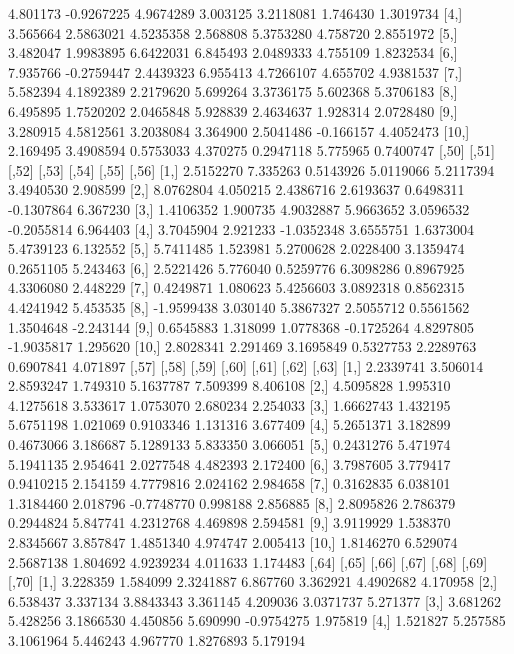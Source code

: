 \documentclass[12pt]{article}
\begin{document}
\begin{Schunk}
\begin{Soutput}
 [3,] 4.801173 -0.9267225 4.9674289 3.003125 3.2118081  1.746430 1.3019734
 [4,] 3.565664  2.5863021 4.5235358 2.568808 5.3753280  4.758720 2.8551972
 [5,] 3.482047  1.9983895 6.6422031 6.845493 2.0489333  4.755109 1.8232534
 [6,] 7.935766 -0.2759447 2.4439323 6.955413 4.7266107  4.655702 4.9381537
 [7,] 5.582394  4.1892389 2.2179620 5.699264 3.3736175  5.602368 5.3706183
 [8,] 6.495895  1.7520202 2.0465848 5.928839 2.4634637  1.928314 2.0728480
 [9,] 3.280915  4.5812561 3.2038084 3.364900 2.5041486 -0.166157 4.4052473
[10,] 2.169495  3.4908594 0.5753033 4.370275 0.2947118  5.775965 0.7400747
           [,50]    [,51]      [,52]      [,53]     [,54]      [,55]     [,56]
 [1,]  2.5152270 7.335263  0.5143926  5.0119066 5.2117394  3.4940530  2.908599
 [2,]  8.0762804 4.050215  2.4386716  2.6193637 0.6498311 -0.1307864  6.367230
 [3,]  1.4106352 1.900735  4.9032887  5.9663652 3.0596532 -0.2055814  6.964403
 [4,]  3.7045904 2.921233 -1.0352348  3.6555751 1.6373004  5.4739123  6.132552
 [5,]  5.7411485 1.523981  5.2700628  2.0228400 3.1359474  0.2651105  5.243463
 [6,]  2.5221426 5.776040  0.5259776  6.3098286 0.8967925  4.3306080  2.448229
 [7,]  0.4249871 1.080623  5.4256603  3.0892318 0.8562315  4.4241942  5.453535
 [8,] -1.9599438 3.030140  5.3867327  2.5055712 0.5561562  1.3504648 -2.243144
 [9,]  0.6545883 1.318099  1.0778368 -0.1725264 4.8297805 -1.9035817  1.295620
[10,]  2.8028341 2.291469  3.1695849  0.5327753 2.2289763  0.6907841  4.071897
          [,57]    [,58]     [,59]    [,60]      [,61]    [,62]    [,63]
 [1,] 2.2339741 3.506014 2.8593247 1.749310  5.1637787 7.509399 8.406108
 [2,] 4.5095828 1.995310 4.1275618 3.533617  1.0753070 2.680234 2.254033
 [3,] 1.6662743 1.432195 5.6751198 1.021069  0.9103346 1.131316 3.677409
 [4,] 5.2651371 3.182899 0.4673066 3.186687  5.1289133 5.833350 3.066051
 [5,] 0.2431276 5.471974 5.1941135 2.954641  2.0277548 4.482393 2.172400
 [6,] 3.7987605 3.779417 0.9410215 2.154159  4.7779816 2.024162 2.984658
 [7,] 0.3162835 6.038101 1.3184460 2.018796 -0.7748770 0.998188 2.856885
 [8,] 2.8095826 2.786379 0.2944824 5.847741  4.2312768 4.469898 2.594581
 [9,] 3.9119929 1.538370 2.8345667 3.857847  1.4851340 4.974747 2.005413
[10,] 1.8146270 6.529074 2.5687138 1.804692  4.9239234 4.011633 1.174483
          [,64]    [,65]     [,66]    [,67]    [,68]      [,69]    [,70]
 [1,]  3.228359 1.584099 2.3241887 6.867760 3.362921  4.4902682 4.170958
 [2,]  6.538437 3.337134 3.8843343 3.361145 4.209036  3.0371737 5.271377
 [3,]  3.681262 5.428256 3.1866530 4.450856 5.690990 -0.9754275 1.975819
 [4,]  1.521827 5.257585 3.1061964 5.446243 4.967770  1.8276893 5.179194

\end{Soutput}
\end{Schunk}
\end{document}
